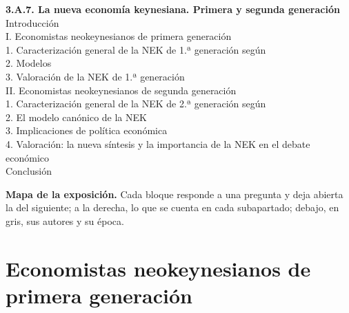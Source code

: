 \documentclass[11pt]{article}
\begin{document}
\begin{esquema}[unbreakable]
\textbf{3.A.7. La nueva economía keynesiana. Primera y segunda generación}\\[2pt]
Introducción\\
I. Economistas neokeynesianos de primera generación\\
\hspace*{1.5em}1. Caracterización general de la NEK de 1.ª generación según \\
\hspace*{1.5em}2. Modelos\\
\hspace*{1.5em}3. Valoración de la NEK de 1.ª generación\\
II. Economistas neokeynesianos de segunda generación\\
\hspace*{1.5em}1. Caracterización general de la NEK de 2.ª generación según \\
\hspace*{1.5em}2. El modelo canónico de la NEK\\
\hspace*{1.5em}3. Implicaciones de política económica\\
\hspace*{1.5em}4. Valoración: la nueva síntesis y la importancia de la NEK en el debate económico\\
Conclusión
\end{esquema}

\begin{anotaciones}
\textbf{Mapa de la exposición.} Cada bloque responde a una pregunta y deja abierta la del siguiente; a la derecha, lo que se cuenta en cada subapartado; debajo, en gris, sus autores y su época.
\begin{infografiacaja}
\caption{Mapa del tema: la pregunta de cada bloque, sus subapartados y el hilo que los une}\label{figu:mapa-tema}
\end{infografiacaja}
\end{anotaciones}



\section{Economistas neokeynesianos de primera generación}\label{sec:primera}
\end{document}
